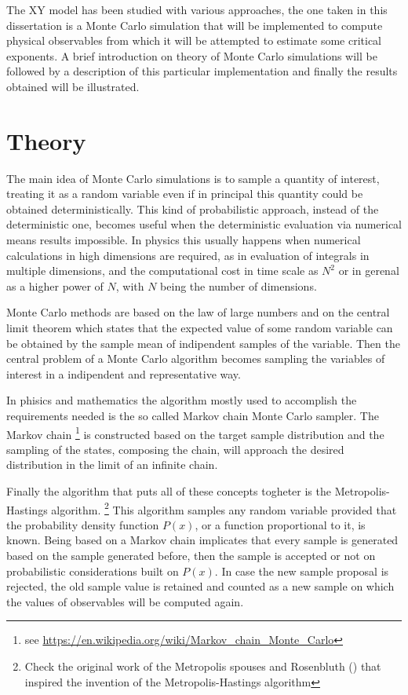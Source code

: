 The XY model has been studied with various approaches, the one taken in this
dissertation is a Monte Carlo simulation that will be implemented to compute
physical observables from which it will be attempted to estimate some critical
exponents. A brief introduction on theory of Monte Carlo simulations will be
followed by a description of this particular implementation and finally the 
results obtained will be illustrated.

\section{Theory}

The main idea of Monte Carlo simulations is to sample a quantity of interest,
treating it as a random variable even if in principal this quantity could be
obtained deterministically. This kind of probabilistic approach, instead of the
deterministic one, becomes useful when the deterministic evaluation via numerical
means results impossible. In physics this usually happens when numerical 
calculations in high dimensions are required, as in evaluation of integrals in 
multiple dimensions, and the computational cost in time scale as $N^2$ or in 
gerenal as a higher power of $N$, with $N$ being the number of dimensions.

Monte Carlo methods are based on the law of large numbers and on the central limit
theorem which states that the expected value of some random variable can be obtained
by the sample mean of indipendent samples of the variable. Then the central problem
of a Monte Carlo algorithm becomes sampling the variables of interest in a
indipendent and representative way.

In phisics and mathematics the algorithm mostly used to accomplish the requirements
needed is the so called Markov chain Monte Carlo sampler. The Markov chain 
\footnote{see \url{https://en.wikipedia.org/wiki/Markov_chain_Monte_Carlo}} is 
constructed based on the target sample distribution and the sampling of the states,
composing the chain, will approach the desired distribution in the limit of an 
infinite chain.

Finally the algorithm that puts all of these concepts togheter is the
Metropolis-Hastings algorithm. \footnote{Check the original work of the Metropolis
spouses and Rosenbluth (\cite{Metropolis1953}) that inspired the invention of the
Metropolis-Hastings algorithm} This algorithm samples any random variable
provided that the probability density function $P(x)$, or a function proportional
to it, is known. Being  based on a Markov chain implicates that every sample is generated
based on the sample generated before, then the sample is accepted or not on 
probabilistic considerations built on $P(x)$. In case the new sample proposal
is rejected, the old sample value is retained and counted as a new sample on which
the values of observables will be computed again.

